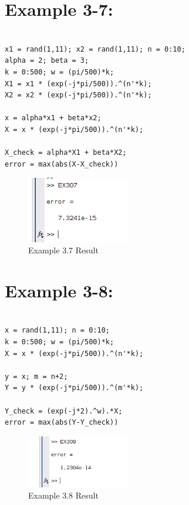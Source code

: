 \documentclass[11pt
  , a4paper
  , article
  , oneside
]{memoir}
\begin{document}
\clearpage

\chapter{Example 3-7:}
\begin{lstlisting}[style=termstyle]
%Example 3.7

x1 = rand(1,11); x2 = rand(1,11); n = 0:10;
alpha = 2; beta = 3;
k = 0:500; w = (pi/500)*k;
X1 = x1 * (exp(-j*pi/500)).^(n'*k); 
X2 = x2 * (exp(-j*pi/500)).^(n'*k); 

x = alpha*x1 + beta*x2;             
X = x * (exp(-j*pi/500)).^(n'*k);   

X_check = alpha*X1 + beta*X2;       
error = max(abs(X-X_check))         
\end{lstlisting}

\begin{figure}[h!]
	\centering
	\includegraphics[width=0.4\textwidth,height=0.15\textwidth]{./images/Ex3-7.png}
	\caption{Example 3.7 Result}
	\label{fig:Example 3-7 Result}
\end{figure}

\chapter{Example 3-8:}
\begin{lstlisting}[style=termstyle]
%Example 3.8

x = rand(1,11); n = 0:10;
k = 0:500; w = (pi/500)*k;
X = x * (exp(-j*pi/500)).^(n'*k); 

y = x; m = n+2;
Y = y * (exp(-j*pi/500)).^(m'*k); 

Y_check = (exp(-j*2).^w).*X;      
error = max(abs(Y-Y_check))    
\end{lstlisting}

\begin{figure}[h!]
	\centering
	\includegraphics[width=0.4\textwidth,height=0.15\textwidth]{./images/Ex3-8.png}
	\caption{Example 3.8 Result}
	\label{fig:Example 3-8 Result}
\end{figure}
\end{document}
